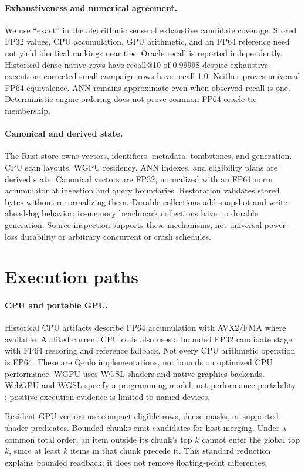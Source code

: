 \documentclass[10pt]{article}
\begin{document}
\paragraph{Exhaustiveness and numerical agreement.}
We use ``exact'' in the algorithmic sense of exhaustive candidate coverage. Stored FP32 values, CPU accumulation, GPU arithmetic, and an FP64 reference need not yield identical rankings near ties. Oracle recall is reported independently. Historical dense native rows have recall@10 of 0.99998 despite exhaustive execution; corrected small-campaign rows have recall 1.0. Neither proves universal FP64 equivalence. ANN remains approximate even when observed recall is one. Deterministic engine ordering does not prove common FP64-oracle tie membership.

\paragraph{Canonical and derived state.}
The Rust store owns vectors, identifiers, metadata, tombstones, and generation. CPU scan layouts, WGPU residency, ANN indexes, and eligibility plans are derived state. Canonical vectors are FP32, normalized with an FP64 norm accumulator at ingestion and query boundaries. Restoration validates stored bytes without renormalizing them. Durable collections add snapshot and write-ahead-log behavior; in-memory benchmark collections have no durable generation. Source inspection supports these mechanisms, not universal power-loss durability or arbitrary concurrent or crash schedules.

\section{Execution paths}
\paragraph{CPU and portable GPU.}
Historical CPU artifacts describe FP64 accumulation with AVX2/FMA where available. Audited current CPU code also uses a bounded FP32 candidate stage with FP64 rescoring and reference fallback. Not every CPU arithmetic operation is FP64. These are Qenlo implementations, not bounds on optimized CPU performance. WGPU uses WGSL shaders and native graphics backends. WebGPU and WGSL specify a programming model, not performance portability \citep{webgpu,wgsl}; positive execution evidence is limited to named devices.

Resident GPU vectors use compact eligible rows, dense masks, or supported shader predicates. Bounded chunks emit candidates for host merging. Under a common total order, an item outside its chunk's top $k$ cannot enter the global top $k$, since at least $k$ items in that chunk precede it. This standard reduction explains bounded readback; it does not remove floating-point differences.
\end{document}
